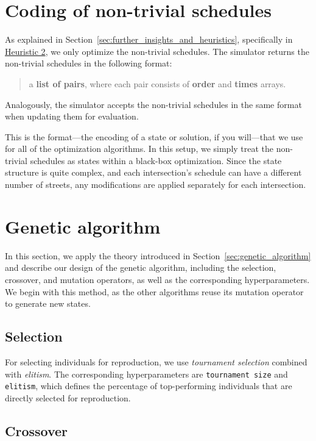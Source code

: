 \section{Coding of non-trivial schedules} \label{sec:coding_of_a_solution}

As explained in Section~\ref{sec:further_insights_and_heuristics}, specifically in \hyperref[para:heuristic_2]{Heuristic 2}, we only optimize the non-trivial schedules. The simulator returns the non-trivial schedules in the following format:
\begin{quote}
    a \textbf{list of pairs}, where each pair consists of \textbf{order} and \textbf{times} arrays.
\end{quote}
Analogously, the simulator accepts the non-trivial schedules in the same format when updating them for evaluation.

This is the format---the encoding of a state or solution, if you will---that we use for all of the optimization algorithms. In this setup, we simply treat the non-trivial schedules as states within a black-box optimization.
Since the state structure is quite complex, and each intersection's schedule can have a different number of streets, any modifications are applied separately for each intersection.

\section{Genetic algorithm} \label{sec:genetic_algorithm_application}

In this section, we apply the theory introduced in Section~\ref{sec:genetic_algorithm} and describe our design of the genetic algorithm, including the selection, crossover, and mutation operators, as well as the corresponding hyperparameters. We begin with this method, as the other algorithms reuse its mutation operator to generate new states.

\subsection{Selection}

For selecting individuals for reproduction, we use \textit{tournament selection} combined with \textit{elitism}. The corresponding hyperparameters are \texttt{tournament size} and \texttt{elitism}, which defines the percentage of top-performing individuals that are directly selected for reproduction.
\subsection{Crossover}

